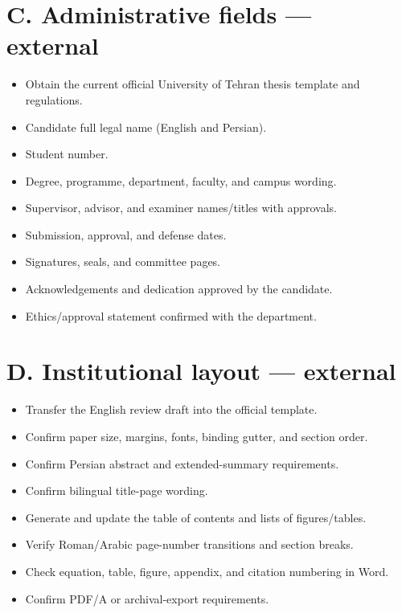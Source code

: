 \section{C. Administrative fields ---
external}\label{c.-administrative-fields-external}

\begin{itemize}
\tightlist
\item[$\square$]
  Obtain the current official University of Tehran thesis template and
  regulations.
\item[$\square$]
  Candidate full legal name (English and Persian).
\item[$\square$]
  Student number.
\item[$\square$]
  Degree, programme, department, faculty, and campus wording.
\item[$\square$]
  Supervisor, advisor, and examiner names/titles with approvals.
\item[$\square$]
  Submission, approval, and defense dates.
\item[$\square$]
  Signatures, seals, and committee pages.
\item[$\square$]
  Acknowledgements and dedication approved by the candidate.
\item[$\square$]
  Ethics/approval statement confirmed with the department.
\end{itemize}

\section{D. Institutional layout ---
external}\label{d.-institutional-layout-external}

\begin{itemize}
\tightlist
\item[$\square$]
  Transfer the English review draft into the official template.
\item[$\square$]
  Confirm paper size, margins, fonts, binding gutter, and section order.
\item[$\square$]
  Confirm Persian abstract and extended-summary requirements.
\item[$\square$]
  Confirm bilingual title-page wording.
\item[$\square$]
  Generate and update the table of contents and lists of figures/tables.
\item[$\square$]
  Verify Roman/Arabic page-number transitions and section breaks.
\item[$\square$]
  Check equation, table, figure, appendix, and citation numbering in
  Word.
\item[$\square$]
  Confirm PDF/A or archival-export requirements.
\end{itemize}


